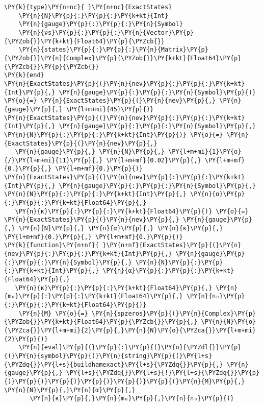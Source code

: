 \begin{Verbatim}[commandchars=\\\{\}]
\PY{k}{type}\PY{n+nc}{ }\PY{n+nc}{ExactStates}
    \PY{n}{N}\PY{p}{:}\PY{p}{:}\PY{k+kt}{Int}
    \PY{n}{gauge}\PY{p}{:}\PY{p}{:}\PY{n}{Symbol}
    \PY{n}{νs}\PY{p}{:}\PY{p}{:}\PY{n}{Vector}\PY{p}{\PYZob{}}\PY{k+kt}{Float64}\PY{p}{\PYZcb{}}
    \PY{n}{states}\PY{p}{:}\PY{p}{:}\PY{n}{Matrix}\PY{p}{\PYZob{}}\PY{n}{Complex}\PY{p}{\PYZob{}}\PY{k+kt}{Float64}\PY{p}{\PYZcb{}}\PY{p}{\PYZcb{}}
\PY{k}{end}
\PY{n}{ExactStates}\PY{p}{(}\PY{n}{nev}\PY{p}{:}\PY{p}{:}\PY{k+kt}{Int}\PY{p}{,} \PY{n}{gauge}\PY{p}{:}\PY{p}{:}\PY{n}{Symbol}\PY{p}{)} \PY{o}{=} \PY{n}{ExactStates}\PY{p}{(}\PY{n}{nev}\PY{p}{,} \PY{n}{gauge}\PY{p}{,} \PY{l+m+mi}{45}\PY{p}{)}
\PY{n}{ExactStates}\PY{p}{(}\PY{n}{nev}\PY{p}{:}\PY{p}{:}\PY{k+kt}{Int}\PY{p}{,} \PY{n}{gauge}\PY{p}{:}\PY{p}{:}\PY{n}{Symbol}\PY{p}{,} \PY{n}{N}\PY{p}{:}\PY{p}{:}\PY{k+kt}{Int}\PY{p}{)} \PY{o}{=} \PY{n}{ExactStates}\PY{p}{(}\PY{n}{nev}\PY{p}{,}
   \PY{n}{gauge}\PY{p}{,} \PY{n}{N}\PY{p}{,} \PY{l+m+mi}{1}\PY{o}{/}\PY{l+m+mi}{11}\PY{p}{,} \PY{l+m+mf}{0.02}\PY{p}{,} \PY{l+m+mf}{0.}\PY{p}{,} \PY{l+m+mf}{0.}\PY{p}{)}
\PY{n}{ExactStates}\PY{p}{(}\PY{n}{nev}\PY{p}{:}\PY{p}{:}\PY{k+kt}{Int}\PY{p}{,} \PY{n}{gauge}\PY{p}{:}\PY{p}{:}\PY{n}{Symbol}\PY{p}{,} \PY{n}{N}\PY{p}{:}\PY{p}{:}\PY{k+kt}{Int}\PY{p}{,} \PY{n}{α}\PY{p}{:}\PY{p}{:}\PY{k+kt}{Float64}\PY{p}{,}
   \PY{n}{κ}\PY{p}{:}\PY{p}{:}\PY{k+kt}{Float64}\PY{p}{)} \PY{o}{=} \PY{n}{ExactStates}\PY{p}{(}\PY{n}{nev}\PY{p}{,} \PY{n}{gauge}\PY{p}{,} \PY{n}{N}\PY{p}{,} \PY{n}{α}\PY{p}{,} \PY{n}{κ}\PY{p}{,} \PY{l+m+mf}{0.}\PY{p}{,} \PY{l+m+mf}{0.}\PY{p}{)}
\PY{k}{function}\PY{n+nf}{ }\PY{n+nf}{ExactStates}\PY{p}{(}\PY{n}{nev}\PY{p}{:}\PY{p}{:}\PY{k+kt}{Int}\PY{p}{,} \PY{n}{gauge}\PY{p}{:}\PY{p}{:}\PY{n}{Symbol}\PY{p}{,} \PY{n}{N}\PY{p}{:}\PY{p}{:}\PY{k+kt}{Int}\PY{p}{,} \PY{n}{α}\PY{p}{:}\PY{p}{:}\PY{k+kt}{Float64}\PY{p}{,}
   \PY{n}{κ}\PY{p}{:}\PY{p}{:}\PY{k+kt}{Float64}\PY{p}{,} \PY{n}{m₀}\PY{p}{:}\PY{p}{:}\PY{k+kt}{Float64}\PY{p}{,} \PY{n}{n₀}\PY{p}{:}\PY{p}{:}\PY{k+kt}{Float64}\PY{p}{)}
    \PY{n}{M} \PY{o}{=} \PY{n}{spzeros}\PY{p}{(}\PY{n}{Complex}\PY{p}{\PYZob{}}\PY{k+kt}{Float64}\PY{p}{\PYZcb{}}\PY{p}{,} \PY{n}{N}\PY{o}{\PYZca{}}\PY{l+m+mi}{2}\PY{p}{,}\PY{n}{N}\PY{o}{\PYZca{}}\PY{l+m+mi}{2}\PY{p}{)}
    \PY{n}{eval}\PY{p}{(}\PY{p}{:}\PY{p}{(}\PY{o}{\PYZdl{}}\PY{p}{(}\PY{n}{symbol}\PY{p}{(}\PY{n}{string}\PY{p}{(}\PY{l+s}{\PYZdq{}}\PY{l+s}{buildhamexact}\PY{l+s}{\PYZdq{}}\PY{p}{,} \PY{n}{gauge}\PY{p}{,} \PY{l+s}{\PYZdq{}}\PY{l+s}{!}\PY{l+s}{\PYZdq{}}\PY{p}{)}\PY{p}{)}\PY{p}{)}\PY{p}{)}\PY{p}{)}\PY{p}{(}\PY{n}{M}\PY{p}{,} \PY{n}{N}\PY{p}{,}\PY{n}{α}\PY{p}{,}
       \PY{n}{κ}\PY{p}{,}\PY{n}{m₀}\PY{p}{,}\PY{n}{n₀}\PY{p}{)}

\end{Verbatim}
